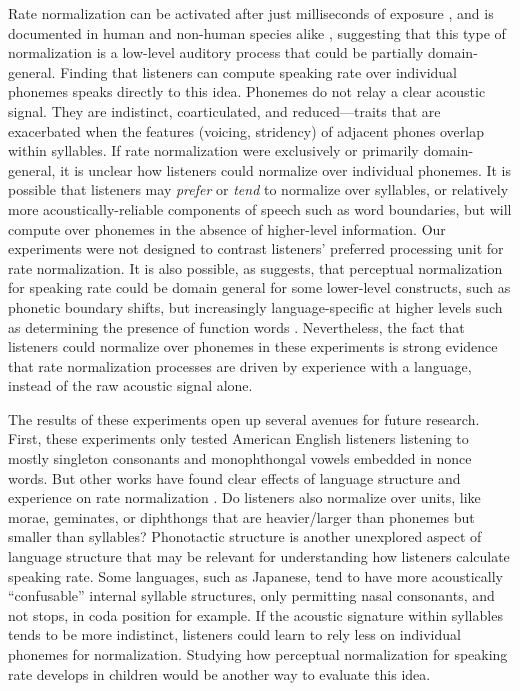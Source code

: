 Rate normalization can be activated after just milliseconds of exposure \citep{reinischSpeakerspecificProcessingLocal2016}, and is documented in human and non-human species alike \citep{welchEffectsSyllablefinalSegment2009}, suggesting that this type of normalization is a low-level auditory process that could be partially domain-general. Finding that listeners can compute speaking rate over individual phonemes speaks directly to this idea. Phonemes do not relay a clear acoustic signal. They are indistinct, coarticulated, and reduced---traits that are exacerbated when the features (voicing, stridency) of adjacent phones overlap within syllables. If rate normalization were exclusively or primarily domain-general, it is unclear how listeners could normalize over individual phonemes. It is possible that listeners may \textit{prefer} or \textit{tend} to normalize over syllables, or relatively more acoustically-reliable components of speech such as word boundaries, but will compute over phonemes in the absence of higher-level information. Our experiments were not designed to contrast listeners' preferred processing unit for rate normalization. It is also possible, as \citet{boskerAccountingRatedependentCategory2017} suggests, that perceptual normalization for speaking rate could be domain general for some lower-level constructs, such as phonetic boundary shifts, but increasingly language-specific at higher levels such as determining the presence of function words \citep{dilleyAlteringContextSpeech2010}. Nevertheless, the fact that listeners could normalize over phonemes in these experiments is strong evidence that rate normalization processes are driven by experience with a language, instead of the raw acoustic signal alone. 

The results of these experiments open up several avenues for future research. First, these experiments only tested American English listeners listening to mostly singleton consonants and monophthongal vowels embedded in nonce words. But other works have found clear effects of language structure and experience on rate normalization \citep{baese-berkNonnativeSpeakersUse2016,steffmanIntonationalStructureMediates2019}. Do listeners also normalize over units, like morae, geminates, or diphthongs that are heavier/larger than phonemes but smaller than syllables? Phonotactic structure is another unexplored aspect of language structure that may be relevant for understanding how listeners calculate speaking rate. Some languages, such as Japanese, tend to have more acoustically ``confusable'' internal syllable structures, only permitting nasal consonants, and not stops, in coda position for example. If the acoustic signature within syllables tends to be more indistinct, listeners could learn to rely less on individual phonemes for normalization. Studying how perceptual normalization for speaking rate develops in children would be another way to evaluate this idea. 

